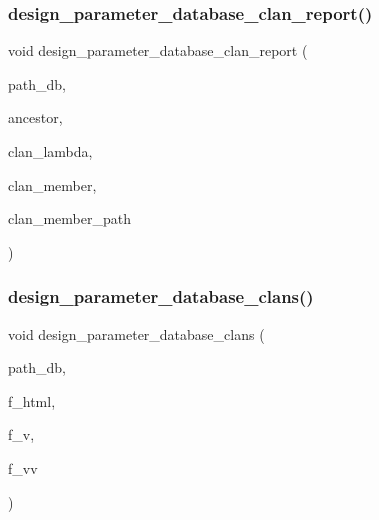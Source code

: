 \mbox{\label{_l_i_b_2_d_i_s_c_r_e_t_a_2design_8_c_a744595779bda605193b61d01d79ad981}} 
\subsubsection{\texorpdfstring{design\+\_\+parameter\+\_\+database\+\_\+clan\+\_\+report()}{design\_parameter\_database\_clan\_report()}}
{\footnotesize\ttfamily void design\+\_\+parameter\+\_\+database\+\_\+clan\+\_\+report (\begin{DoxyParamCaption}\item[{\mbox{\hyperlink{galois_8h_ab6cc7b4aeb6ea31aba2b3fbfc83ff5e6}{B\+Y\+TE}} $\ast$}]{path\+\_\+db,  }\item[{\mbox{\hyperlink{class_vector}{Vector}} \&}]{ancestor,  }\item[{\mbox{\hyperlink{class_vector}{Vector}} \&}]{clan\+\_\+lambda,  }\item[{\mbox{\hyperlink{class_vector}{Vector}} \&}]{clan\+\_\+member,  }\item[{\mbox{\hyperlink{class_vector}{Vector}} \&}]{clan\+\_\+member\+\_\+path }\end{DoxyParamCaption})}

\mbox{\label{_l_i_b_2_d_i_s_c_r_e_t_a_2design_8_c_a730cc0fd8e835bbaa467231eebffd74e}} 
\subsubsection{\texorpdfstring{design\+\_\+parameter\+\_\+database\+\_\+clans()}{design\_parameter\_database\_clans()}}
{\footnotesize\ttfamily void design\+\_\+parameter\+\_\+database\+\_\+clans (\begin{DoxyParamCaption}\item[{\mbox{\hyperlink{galois_8h_ab6cc7b4aeb6ea31aba2b3fbfc83ff5e6}{B\+Y\+TE}} $\ast$}]{path\+\_\+db,  }\item[{\mbox{\hyperlink{galois_8h_a09fddde158a3a20bd2dcadb609de11dc}{I\+NT}}}]{f\+\_\+html,  }\item[{\mbox{\hyperlink{galois_8h_a09fddde158a3a20bd2dcadb609de11dc}{I\+NT}}}]{f\+\_\+v,  }\item[{\mbox{\hyperlink{galois_8h_a09fddde158a3a20bd2dcadb609de11dc}{I\+NT}}}]{f\+\_\+vv }\end{DoxyParamCaption})}

